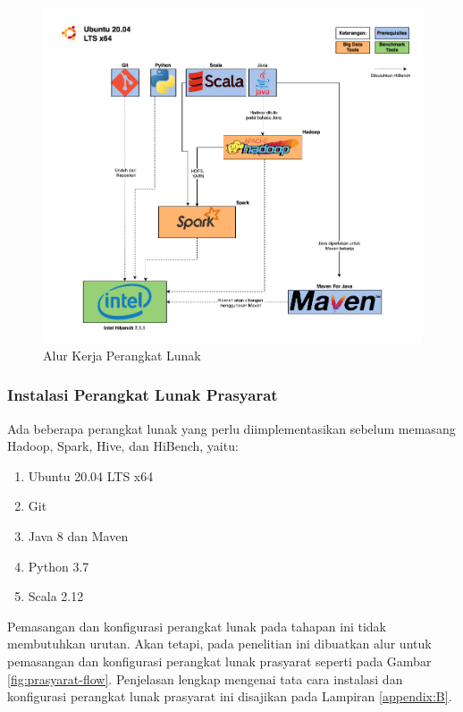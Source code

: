 \begin{figure}[h]
    \centering
    \includegraphics[width=1\textwidth]{figures/ch03/alurkerja-soft.png}
    \caption{Alur Kerja Perangkat Lunak}
    \label{fig:alurkerja-soft}
\end{figure}

\subsubsection{Instalasi Perangkat Lunak Prasyarat}
Ada beberapa perangkat lunak yang perlu diimplementasikan sebelum memasang Hadoop, Spark, Hive, dan HiBench, yaitu:
\begin{enumerate}
	\item Ubuntu 20.04 LTS x64
	\item Git
	\item Java 8 dan Maven
	\item Python 3.7
	\item Scala 2.12
\end{enumerate}

Pemasangan dan konfigurasi perangkat lunak pada tahapan ini tidak membutuhkan urutan. Akan tetapi, pada penelitian ini dibuatkan alur untuk pemasangan dan konfigurasi perangkat lunak prasyarat seperti pada Gambar \ref{fig:prasyarat-flow}. Penjelasan lengkap mengenai tata cara instalasi dan konfigurasi perangkat lunak prasyarat ini disajikan pada Lampiran \ref{appendix:B}. 


